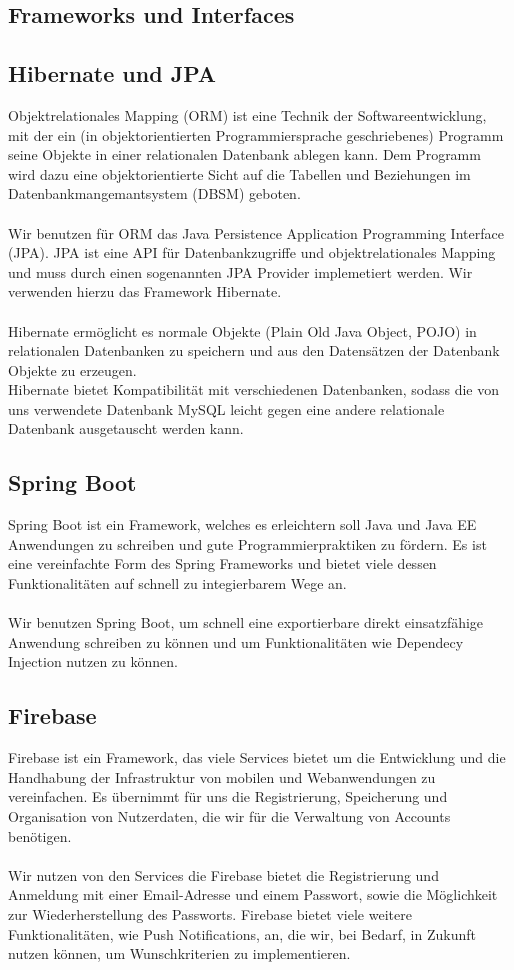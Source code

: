 \documentclass[a4paper]{scrreprt}
\begin{document}
\subsection{Frameworks und Interfaces}
\subsection*{Hibernate und JPA}

Objektrelationales Mapping (ORM) ist eine Technik der Softwareentwicklung, mit der ein (in objektorientierten Programmiersprache geschriebenes) Programm seine Objekte in einer relationalen Datenbank ablegen kann. Dem Programm wird dazu eine objektorientierte Sicht auf die Tabellen und Beziehungen im Datenbankmangemantsystem (DBSM) geboten. \\  \\ Wir benutzen für ORM das Java Persistence Application Programming Interface (JPA). 
JPA ist eine API für Datenbankzugriffe und objektrelationales Mapping und muss durch einen sogenannten JPA Provider implemetiert werden. Wir verwenden hierzu das Framework Hibernate.\\ \\ Hibernate ermöglicht es normale Objekte (Plain Old Java Object, POJO) in relationalen Datenbanken zu speichern und aus den Datensätzen der Datenbank Objekte zu erzeugen. \\
Hibernate bietet Kompatibilität mit verschiedenen Datenbanken, sodass die von uns verwendete Datenbank MySQL leicht gegen eine andere relationale Datenbank ausgetauscht werden kann.

\subsection*{Spring Boot}

Spring Boot ist ein Framework, welches es erleichtern soll Java und Java EE Anwendungen zu schreiben und gute Programmierpraktiken zu fördern. Es ist eine vereinfachte Form des Spring Frameworks und bietet viele dessen Funktionalitäten auf schnell zu integierbarem Wege an. \\ \\
Wir benutzen Spring Boot, um schnell eine exportierbare direkt einsatzfähige Anwendung schreiben zu können und um Funktionalitäten wie Dependecy Injection nutzen zu können.

\subsection*{Firebase}
Firebase ist ein Framework, das viele Services bietet um die Entwicklung und die Handhabung der Infrastruktur von mobilen und Webanwendungen zu vereinfachen. Es übernimmt für uns die Registrierung, Speicherung und Organisation von Nutzerdaten, die wir für die Verwaltung von Accounts benötigen. \\ \\
Wir nutzen von den Services die Firebase bietet die Registrierung und Anmeldung mit einer Email-Adresse und einem Passwort, sowie die Möglichkeit zur Wiederherstellung des Passworts. Firebase bietet viele weitere Funktionalitäten, wie Push Notifications, an, die wir, bei Bedarf, in Zukunft nutzen können, um Wunschkriterien zu implementieren.
\end{document}
